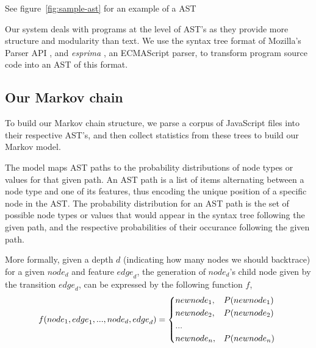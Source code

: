 \documentclass{article}
\begin{document}
\begin{center}


See figure~\ref{fig:sample-ast} for an example of a AST




\end{center}

Our system deals with programs at the level of AST's as they provide more structure and modularity than text.
We use the syntax tree format of Mozilla's Parser API \cite{parser api}, and \emph{esprima} \cite{esprima}, an ECMAScript
parser, to transform program source code into an AST of this format.


\subsection{Our Markov chain}

To build our Markov chain structure, we parse a corpus of JavaScript files into their
respective AST's, and then collect statistics from these trees to build our Markov model. 

The model maps AST paths to the probability distributions of node types or values for that given
path. An AST path is a list of items alternating between a node type and one of its features, thus encoding the unique position of a 
specific node in the AST. The probability distribution for an AST path is the set of possible node types or values that would appear in the
syntax tree following the given path, and the respective probabilities of their
occurance following the given path.

More formally, given a depth $d$ (indicating how many nodes we should backtrace) for a given
${node}_d$ and feature ${edge}_d$, the generation of ${node}_d$'s child node given by the
transition ${edge}_d$, can be expressed by the following function $f$, \begin{align*}
f({node}_1, {edge}_1, ..., {node}_{d}, {edge}_{d}) = \begin{dcases*}
		{newnode_1},	&	$P({newnode_1})$ \\
		{newnode_2},	&	$P({newnode_2})$ \\
		...\\
		{newnode_n},    &   $P({newnode_n})$ \\
	\end{dcases*}
\end{align*}
\end{document}
